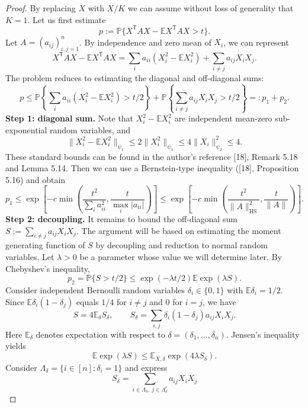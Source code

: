 \documentclass[UTF8,11pt]{ctexart}
\theoremstyle{definition}
\begin{document}
\begin{proof}
By replacing $X$ with $X/K$ we can assume without loss of generality that
$K=1$. Let us first estimate
\[
p:=\mathbb P\{X^{\mathsf T}AX-\mathbb E X^{\mathsf T}AX>t\}.
\]
Let $A=(a_{ij})_{i,j=1}^n$. By independence and zero mean of $X_i$, we can represent
\[
X^{\mathsf T}AX-\mathbb E X^{\mathsf T}AX
=\sum_i a_{ii}(X_i^2-\mathbb E X_i^2)+\sum_{i\ne j}a_{ij}X_iX_j.
\]
The problem reduces to estimating the diagonal and off-diagonal sums:
\[
p\leq\mathbb P\!\left\{\sum_i a_{ii}(X_i^2-\mathbb E X_i^2)>t/2\right\}
+\mathbb P\!\left\{\sum_{i\ne j}a_{ij}X_iX_j>t/2\right\}=:p_1+p_2.
\]
\textbf{Step 1: diagonal sum.}
Note that $X_i^2-\mathbb E X_i^2$ are independent mean-zero sub-exponential
random variables, and
\[
\|X_i^2-\mathbb E X_i^2\|_{\psi_1}
\leq2\|X_i^2\|_{\psi_1}\leq4\|X_i\|_{\psi_2}^2\leq4.
\]
These standard bounds can be found in the author's reference [18],
Remark 5.18 and Lemma 5.14. Then we can use a Bernstein-type inequality
([18], Proposition 5.16) and obtain
\begin{equation}\label{hw-diag}
p_1\leq\exp\!\left[-c\min\left(\frac{t^2}{\sum_i a_{ii}^2},
\frac{t}{\max_i|a_{ii}|}\right)\right]
\leq\exp\!\left[-c\min\left(\frac{t^2}{\|A\|_{\mathrm{HS}}^2},
\frac{t}{\|A\|}\right)\right].
\end{equation}
\textbf{Step 2: decoupling.}
It remains to bound the off-diagonal sum $S:=\sum_{i\ne j}a_{ij}X_iX_j$.
The argument will be based on estimating the moment generating function of $S$
by decoupling and reduction to normal random variables.
Let $\lambda>0$ be a parameter whose value we will determine later. By
Chebyshev's inequality,
\begin{equation}\label{hw-markov}
p_2=\mathbb P\{S>t/2\}\leq\exp(-\lambda t/2)\mathbb E\exp(\lambda S).
\end{equation}
Consider independent Bernoulli random variables $\delta_i\in\{0,1\}$ with
$\mathbb E\delta_i=1/2$. Since $\mathbb E\delta_i(1-\delta_j)$ equals $1/4$
for $i\ne j$ and $0$ for $i=j$, we have
\[
S=4\mathbb E_\delta S_\delta,\qquad
S_\delta=\sum_{i,j}\delta_i(1-\delta_j)a_{ij}X_iX_j.
\]
Here $\mathbb E_\delta$ denotes expectation with respect to
$\delta=(\delta_1,\ldots,\delta_n)$. Jensen's inequality yields
\begin{equation}\label{hw-jensen}
\mathbb E\exp(\lambda S)\leq\mathbb E_{X,\delta}\exp(4\lambda S_\delta).
\end{equation}
Consider $\Lambda_\delta=\{i\in[n]:\delta_i=1\}$ and express
\[
S_\delta=\sum_{i\in\Lambda_\delta,\ j\in\Lambda_\delta^c}a_{ij}X_iX_j
\]
\end{proof}
\end{document}
